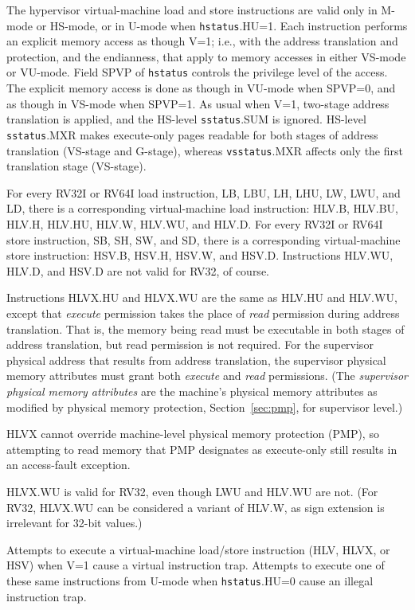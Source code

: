 The hypervisor virtual-machine load and store instructions are valid only
in M-mode or HS-mode, or in U-mode when {\tt hstatus}.HU=1.
Each instruction performs an explicit memory access as though V=1;
i.e., with the address translation and protection, and the endianness,
that apply to memory accesses in either VS-mode or VU-mode.
Field SPVP of {\tt hstatus} controls the privilege level of the access.
The explicit memory access is done as though in VU-mode when SPVP=0, and
as though in VS-mode when SPVP=1.
As usual when V=1, two-stage address translation is applied, and the
HS-level {\tt sstatus}.SUM is ignored.
HS-level {\tt sstatus}.MXR makes execute-only pages readable for
both stages of address translation (VS-stage and G-stage), whereas
{\tt vsstatus}.MXR affects only the first translation stage (VS-stage).

For every RV32I or RV64I load instruction, LB, LBU, LH, LHU, LW, LWU,
and LD, there is a corresponding virtual-machine load instruction:
HLV.B, HLV.BU, HLV.H, HLV.HU, HLV.W, HLV.WU, and HLV.D.
For every RV32I or RV64I store instruction, SB, SH, SW, and SD, there is
a corresponding virtual-machine store instruction:  HSV.B, HSV.H, HSV.W,
and HSV.D.
Instructions HLV.WU, HLV.D, and HSV.D are not valid for RV32, of course.

Instructions HLVX.HU and HLVX.WU are the same as HLV.HU and HLV.WU,
except that \textit{execute} permission takes the place of \textit{read}
permission during address translation.
That is, the memory being read must be executable in both stages of
address translation, but read permission is not required.
For the supervisor physical address that results from address
translation, the supervisor physical memory attributes must grant both
\textit{execute} and \textit{read} permissions.
(The \textit{supervisor physical memory attributes} are the machine's
physical memory attributes as modified by physical memory protection,
Section~\ref{sec:pmp}, for supervisor level.)

\begin{commentary}
HLVX cannot override machine-level physical memory protection (PMP),
so attempting to read memory that PMP designates as execute-only still
results in an access-fault exception.
\end{commentary}

HLVX.WU is valid for RV32, even though LWU and HLV.WU are not.
(For RV32, HLVX.WU can be considered a variant of HLV.W, as sign
extension is irrelevant for 32-bit values.)

Attempts to execute a virtual-machine load/store instruction (HLV, HLVX,
or HSV) when V=1 cause a virtual instruction trap.
Attempts to execute one of these same instructions from U-mode when
{\tt hstatus}.HU=0 cause an illegal instruction trap.

